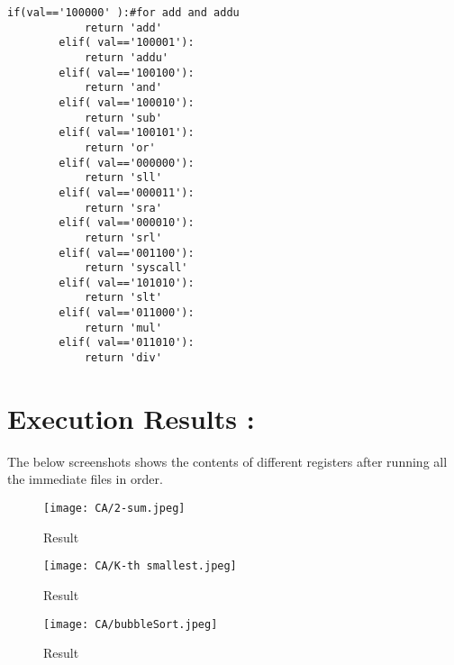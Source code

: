 \documentclass[a4paper,10pt]{article} %
\begin{document}
\begin{codebox} 
\begin{lstlisting}[language=assembly]
        if(val=='100000' ):#for add and addu
            return 'add'
        elif( val=='100001'):
            return 'addu'
        elif( val=='100100'):
            return 'and'
        elif( val=='100010'):
            return 'sub'
        elif( val=='100101'):
            return 'or'
        elif( val=='000000'):
            return 'sll'
        elif( val=='000011'):
            return 'sra'
        elif( val=='000010'):
            return 'srl'
        elif( val=='001100'):
            return 'syscall'
        elif( val=='101010'):
            return 'slt'
        elif( val=='011000'):
            return 'mul'
        elif( val=='011010'):
            return 'div'
\end{lstlisting} 
\end{codebox}



\newpage

\section*{\huge{\textbf{Execution Results :}}}
The below screenshots shows the contents of different registers after running all the immediate files in order.

\begin{figure}[H] %
    \centering
    \texttt{[image: CA/2-sum.jpeg]}
    \caption{Result}
\end{figure}

\newpage

\begin{figure}[H] %
    \centering
    \texttt{[image: CA/K-th smallest.jpeg]}
    \caption{Result}
\end{figure}
\newpage

\begin{figure}[H] %
    \centering
    \texttt{[image: CA/bubbleSort.jpeg]}
    \caption{Result}
\end{figure}




\end{document}
